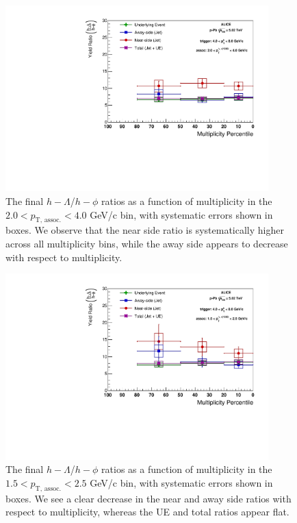 \documentclass[ALICE,manyauthors]{ALICE_analysis_notes}
\begin{document}
\begin{figure}[ht]
\centering
\includegraphics[width=4in]{figures/lambda_phi_ratio_plot.pdf}
\caption{The final $h-\Lambda$/$h-\phi$ ratios as a function of multiplicity in the $2.0 < p_{\text{T, assoc.}} < 4.0$ GeV/c bin, with systematic errors shown in boxes. We observe that the near side ratio is systematically higher across all multiplicity bins, while the away side appears to decrease with respect to multiplicity.}
\label{lambda_phi_ratio}
\end{figure}
\begin{figure}[ht]
\centering
\includegraphics[width=4in]{figures/lambda_phi_ratio_plot_lowpt.pdf}
\caption{The final $h-\Lambda$/$h-\phi$ ratios as a function of multiplicity in the $1.5 < p_{\text{T, assoc.}} < 2.5$ GeV/c bin, with systematic errors shown in boxes. We see a clear decrease in the near and away side ratios with respect to multiplicity, whereas the UE and total ratios appear flat.}
\label{lambda_phi_ratio_lowpt}
\end{figure}
\end{document}
